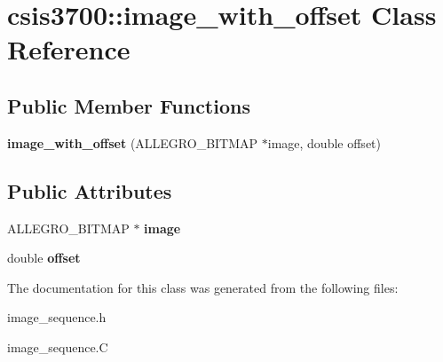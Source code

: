 \hypertarget{classcsis3700_1_1image__with__offset}{\section{csis3700\-:\-:image\-\_\-with\-\_\-offset Class Reference}
\label{classcsis3700_1_1image__with__offset}
}
\subsection*{Public Member Functions}
\begin{DoxyCompactItemize}
\item 
\hypertarget{classcsis3700_1_1image__with__offset_ad9d01a0d16d8f36981054d6f16967d1f}{{\bfseries image\-\_\-with\-\_\-offset} (A\-L\-L\-E\-G\-R\-O\-\_\-\-B\-I\-T\-M\-A\-P $\ast$image, double offset)}\label{classcsis3700_1_1image__with__offset_ad9d01a0d16d8f36981054d6f16967d1f}

\end{DoxyCompactItemize}
\subsection*{Public Attributes}
\begin{DoxyCompactItemize}
\item 
\hypertarget{classcsis3700_1_1image__with__offset_a9440b6eb66dfad9a7bf83b5dfe8baf86}{A\-L\-L\-E\-G\-R\-O\-\_\-\-B\-I\-T\-M\-A\-P $\ast$ {\bfseries image}}\label{classcsis3700_1_1image__with__offset_a9440b6eb66dfad9a7bf83b5dfe8baf86}

\item 
\hypertarget{classcsis3700_1_1image__with__offset_a15708b2a95ca7a765baccb19df7bd0c6}{double {\bfseries offset}}\label{classcsis3700_1_1image__with__offset_a15708b2a95ca7a765baccb19df7bd0c6}

\end{DoxyCompactItemize}


The documentation for this class was generated from the following files\-:\begin{DoxyCompactItemize}
\item 
image\-\_\-sequence.\-h\item 
image\-\_\-sequence.\-C\end{DoxyCompactItemize}
